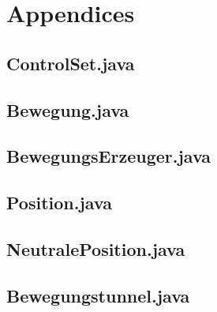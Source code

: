 \documentclass[11pt,a4paper,oneside]{report}
\begin{document}
\section*{Appendices}
\subsection*{ControlSet.java}
\subsection*{Bewegung.java}
\subsection*{BewegungsErzeuger.java}
\subsection*{Position.java}
\subsection*{NeutralePosition.java}
\subsection*{Bewegungstunnel.java}
\end{document}
